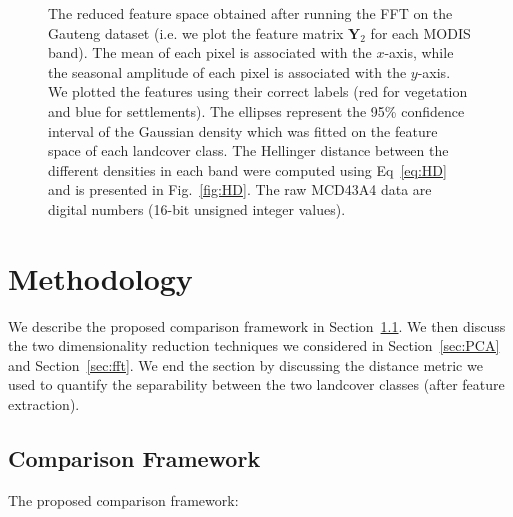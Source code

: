 \documentclass{article}
\begin{document}
\begin{figure}[h!]
%
\caption{The reduced feature space obtained after running the FFT on the Gauteng dataset (i.e. we plot the feature matrix $\mathbf{Y}_2$ for each MODIS band). The mean of each pixel is associated with the $x$-axis, while the seasonal amplitude of each pixel is associated with the $y$-axis. We plotted the features using their correct labels (red for vegetation 
and blue for settlements). The ellipses represent the 95\% confidence interval of the Gaussian density which was fitted on the feature space of each landcover class. The Hellinger 
distance between the different densities in each band were computed using Eq~\ref{eq:HD} and is presented in Fig.~\ref{fig:HD}. The raw MCD43A4 data are
digital numbers (16-bit unsigned integer values).}
\label{fig:density_FFT}
%
\end{figure}

\vfill
\pagebreak

\section{Methodology}
\label{sec:met}
We describe the proposed comparison framework in Section~\ref{sec:comp}. We then discuss the two dimensionality reduction techniques we considered in Section~\ref{sec:PCA} and Section~\ref{sec:fft}. 
We end the section by discussing the distance metric we used to quantify the separability between the two landcover classes (after feature extraction). 

\subsection{Comparison Framework}
\label{sec:comp}
The proposed comparison framework:
\end{document}
